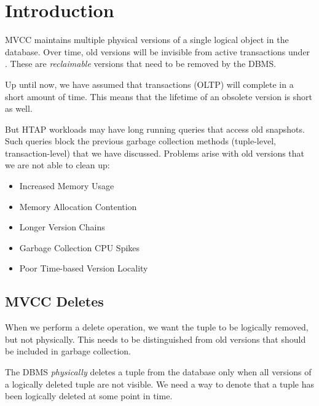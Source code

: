 \documentclass[11pt]{article}
\begin{document}
\maketitle
\thispagestyle{plain}

\section{Introduction}
MVCC maintains multiple physical versions of a single logical object in the database. Over time, old versions will be invisible from active transactions under . These are \textit{reclaimable} versions that need to be removed by the DBMS.

Up until now, we have assumed that transactions (OLTP) will complete in a short amount of time. This means that the lifetime of an obsolete version is short as well.

But HTAP workloads may have long running queries that access old snapshots. Such queries block the previous garbage collection methods (tuple-level, transaction-level) that we have discussed. Problems arise with old versions that we are not able to clean up:
\begin{itemize}
    \item Increased Memory Usage
    \item Memory Allocation Contention
    \item Longer Version Chains
    \item Garbage Collection CPU Spikes
    \item Poor Time-based Version Locality
\end{itemize}

\subsection*{MVCC Deletes}
When we perform a delete operation, we want the tuple to be logically removed, but not physically. This needs to be distinguished from old versions that should be included in garbage collection.

The DBMS \textit{physically} deletes a tuple from the database only when all versions of a logically deleted tuple are not visible. We need a way to denote that a tuple has been logically deleted at some point in time.
\end{document}
